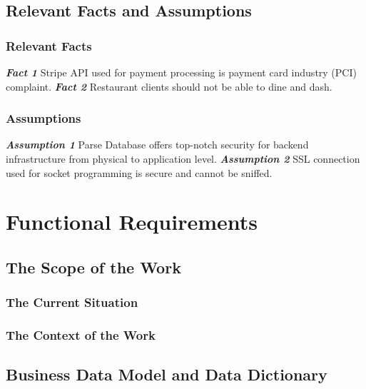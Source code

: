 \documentclass[12pt, titlepage]{article}
\begin{document}
\subsection{Relevant Facts and Assumptions} 
\subsubsection{Relevant Facts}
\textbf{\textit{Fact 1}}\newline
Stripe API used for payment processing is payment card industry (PCI) complaint.
\newline\newline
\textbf{\textit{Fact 2}}\newline
Restaurant clients should not be able to dine and dash.\newline

\subsubsection{Assumptions}

\textbf{\textit{Assumption  1}}\newline
Parse Database offers top-notch security for backend infrastructure from physical to application level.
\newline\newline
\textbf{\textit{Assumption  2}}\newline
SSL connection used for socket programming is secure and cannot be sniffed.

\section{Functional Requirements} 

\subsection{The Scope of the Work}
\subsubsection{The Current Situation}
\subsubsection{The Context of the Work} 
\subsection{Business Data Model and Data Dictionary}
\end{document}

